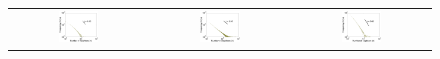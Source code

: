 \documentclass[11pt,a4paper]{book}
\newcommand{\wThree}{0.31}
\begin{document}
\begin{figure}[h!]
  \centering
  \begin{tabular}{c c c}
    \includegraphics[width=\wThree\textwidth]{img-st/degree.weightx.dblp_coauthor} &
    \includegraphics[width=\wThree\textwidth]{img-st/degree.weightx.edit-ptwiki} &
    \includegraphics[width=\wThree\textwidth]{img-st/degree.weightx.facebook-wosn-wall} \\

\end{tabular}
\end{figure}
\end{document}
